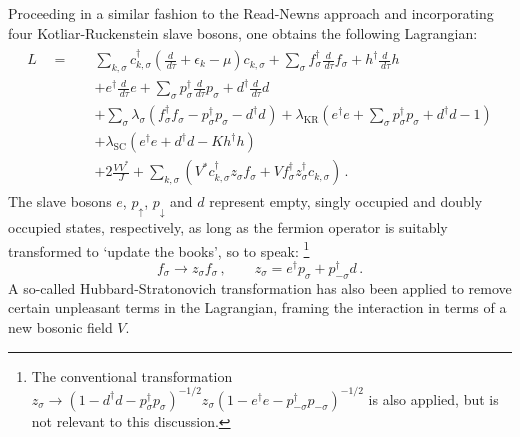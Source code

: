 \documentclass[12pt]{article}
\begin{document}
Proceeding in a similar fashion to the Read-Newns approach and incorporating four Kotliar-Ruckenstein \cite{KotliarRuckenstein} slave bosons, one obtains the following Lagrangian:
\begin{align}
\begin{split}
L \quad = \quad &\sum_{k,\sigma} c^{\dagger}_{k,\sigma} \left( \frac{d}{\,d\tau} + \epsilon_k - \mu \right) c^{}_{k,\sigma} + \sum_{\sigma} f^{\dagger}_{\sigma} \frac{d}{\,d\tau} f^{}_{\sigma} + h^{\dagger} \frac{d}{\,d\tau}h \\
&+ e^{\dagger} \frac{d}{\,d\tau} e  + \sum_{\sigma} p^{\dagger}_{\sigma} \frac{d}{\,d\tau} p^{}_{\sigma} + d^{\dagger} \frac{d}{\,d\tau} d\\
&+ \sum_{\sigma} \lambda^{}_{\sigma} (f^{\dagger}_{\sigma} f^{}_{\sigma} - p^{\dagger}_{\sigma} p^{}_{\sigma} - d^{\dagger} d^{} ) + \lambda_{\text{KR}} ( e^{\dagger} e + \sum_{\sigma} p^{\dagger}_{\sigma} p^{}_{\sigma} + d^{\dagger} d - 1)\\
&+\lambda_{\text{SC}} ( e^{\dagger} e + d^{\dagger} d - K h^{\dagger} h)\\
&+ 2 \frac{V V^{\ast}}{J} + \sum_{k,\sigma} \left( V^{\ast} c^{\dagger}_{k,\sigma} z^{}_{\sigma} f^{}_{\sigma} + V f^{\dagger}_{\sigma} z^{\dagger}_{\sigma} c^{}_{k,\sigma} \right) \,.\label{eq:Lagrangian}
\end{split}
\end{align}
The slave bosons $ e $, $ p_{\uparrow} $, $ p_{\downarrow} $ and $ d $ represent empty, singly occupied and doubly occupied states, respectively, as long as the fermion operator is suitably transformed to `update the books', so to speak: \footnote{The conventional transformation $ z^{}_{\sigma} \rightarrow (1 - d^{\dagger} d - p^{\dagger}_{\sigma} p^{}_{\sigma})^{- 1 / 2} z^{}_{\sigma} (1 - e^{\dagger} e - p^{\dagger}_{- \sigma} p^{}_{- \sigma})^{- 1 / 2} $ is also applied, but is not relevant to this discussion.} \begin{equation} f^{}_{\sigma} \rightarrow z^{}_{\sigma} f^{}_{\sigma}\,, \qquad z_{\sigma} = e^{\dagger} p^{}_{\sigma} + p^{\dagger}_{-\sigma} d \,. \end{equation} A so-called Hubbard-Stratonovich transformation has also been applied to remove certain unpleasant terms in the Lagrangian, framing the interaction in terms of a new bosonic field $ V $.

\end{document}
